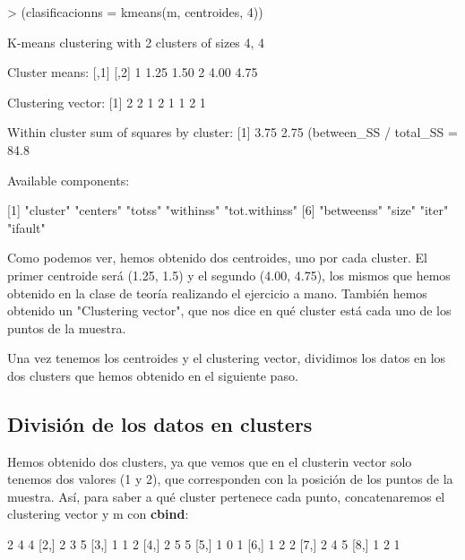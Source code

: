 \documentclass[a4paper]{article}
\begin{document}
\begin{Schunk}
\begin{Sinput}
> (clasificacionns = kmeans(m, centroides, 4))
\end{Sinput}
\begin{Soutput}
K-means clustering with 2 clusters of sizes 4, 4

Cluster means:
  [,1] [,2]
1 1.25 1.50
2 4.00 4.75

Clustering vector:
[1] 2 2 1 2 1 1 2 1

Within cluster sum of squares by cluster:
[1] 3.75 2.75
 (between_SS / total_SS =  84.8 %

Available components:

[1] "cluster"      "centers"      "totss"        "withinss"     "tot.withinss"
[6] "betweenss"    "size"         "iter"         "ifault"      
\end{Soutput}
\end{Schunk}

Como podemos ver, hemos obtenido dos centroides, uno por cada cluster. El primer centroide será (1.25, 1.5) y el segundo (4.00, 4.75), los mismos que hemos obtenido en la clase de teoría realizando el ejercicio a mano. También hemos obtenido un "Clustering vector", que nos dice en qué cluster está cada uno de los puntos de la muestra.

Una vez tenemos los centroides y el clustering vector, dividimos los datos en los dos clusters que hemos obtenido en el siguiente paso.

\subsection{División de los datos en clusters}Hemos obtenido dos clusters, ya que vemos que en el clusterin vector solo tenemos dos valores (1 y 2), que corresponden con la posición de los puntos de la muestra. Así, para saber a qué cluster pertenece cada punto, concatenaremos el clustering vector y m con \textbf{cbind}:

\begin{Schunk}
\begin{Soutput}
     [,1] [,2] [,3]
[1,]    2    4    4
[2,]    2    3    5
[3,]    1    1    2
[4,]    2    5    5
[5,]    1    0    1
[6,]    1    2    2
[7,]    2    4    5
[8,]    1    2    1
\end{Soutput}
\end{Schunk}
\end{document}
